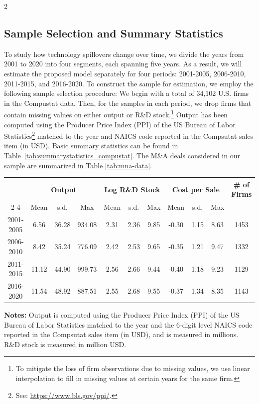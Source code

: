 \documentclass[12pt]{article}
\begin{document}
\begin{spacing}{2}
\subsection{Sample Selection and Summary Statistics}
\label{sec:Sample_selection}
To study how technology spillovers change over time, we divide the years from 2001 to 2020 into four segments, each spanning five years. As a result, we will estimate the proposed model separately for four periods: 2001-2005, 2006-2010, 2011-2015, and 2016-2020. To construct the sample for estimation, we employ the following sample selection procedure: We begin with a total of 34,102 U.S. firms in the Compustat data. Then, for the samples in each period, we drop firms that contain missing values on either output or R\&D stock.\footnote{To mitigate the loss of firm observations due to missing values, we use linear interpolation to fill in missing values at certain years for the same firm.} Output has been computed using the Producer Price Index (PPI) of the US Bureau of Labor Statistics\footnote{See: \url{https://www.bls.gov/ppi/}.} matched to the year and NAICS code reported in the Compsutat sales item (in USD). Basic summary statistics can be found in Table~\ref{tab:summarystatistics_compustat}. The M\&A deals considered in our sample are summarized in Table \ref{tab:mna-data}.
       
\begin{center}
\singlespacing
\begin{threeparttable}[tp]
  \caption{Summary statistics.}
    \begin{tabular}{ccccccccccc}
    \toprule
          & \multicolumn{3}{c}{Output} & \multicolumn{3}{c}{Log R\&D Stock } & \multicolumn{3}{c}{Cost per Sale} & \multirow{ 2}{*}{\# of Firms} \\
    \cmidrule{2-4}\cmidrule{5-7}\cmidrule{8-10}  
          & Mean  & s.d.  & Max   & Mean  & s.d.  & Max   & Mean  & s.d. & Max   &  \\
    \midrule 
    2001-2005 & 6.56  & 36.28 & 934.08 & 2.31  & 2.36  & 9.85  & -0.30 & 1.15  & 8.63 & 1453 \\
    2006-2010 & 8.42  & 35.24 & 776.09 & 2.42  & 2.53  & 9.65  & -0.35 & 1.21  & 9.47 & 1332 \\
    2011-2015 & 11.12 & 44.90 & 999.73 & 2.56  & 2.66  & 9.44  & -0.40 & 1.18  & 9.23 & 1129 \\
    2016-2020 & 11.54 & 48.92 & 887.51 & 2.55  & 2.68  & 9.55  & -0.37 & 1.34  & 8.35 & 1143 \\
\midrule
    \bottomrule
    \end{tabular}
\begin{tablenotes}[flushleft]
\item \small \textbf{Notes:} Output is computed using the Producer Price Index (PPI) of the US Bureau of Labor Statistics matched to the year and the 6-digit level NAICS code reported in the Compsutat sales item (in USD), and is measured in millions. R\&D stock is measured in million USD.
\end{tablenotes}  
\label{tab:summarystatistics_compustat}%
\end{threeparttable}
\end{center}


\end{spacing}
\end{document}

